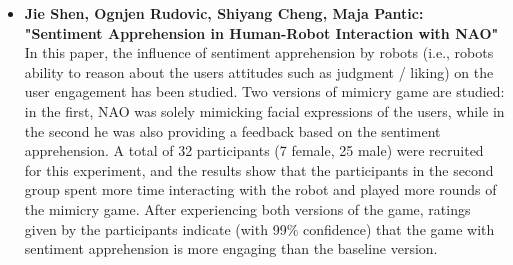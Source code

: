 \documentclass[oneside,a4paper,12pt]{report}
\begin{document}
\begin{normalsize}
\begin{itemize}
		\vspace{5mm}
	\item \textbf{Jie Shen, Ognjen Rudovic, Shiyang Cheng, Maja Pantic:  "Sentiment Apprehension in Human-Robot Interaction with NAO"} \cite{shen15_sentim_nao} \\
	In this paper, the influence of sentiment apprehension by robots (i.e., robots ability to reason about the users attitudes such as judgment / liking) on the user engagement has been studied. Two versions of mimicry game are studied: in the first, NAO was solely mimicking facial expressions of the users, while in the second he was also providing a feedback based on the sentiment apprehension. A total of 32 participants (7 female, 25 male) were recruited for this experiment, and the results show that the participants in the second group spent more time interacting with the robot and played more rounds of the mimicry game. After experiencing both versions of the game, ratings given by the participants indicate (with 99\% confidence) that the game with sentiment apprehension is more engaging than the baseline version.
		\vspace{5mm}
	

\end{itemize}
\end{normalsize}
\end{document}
